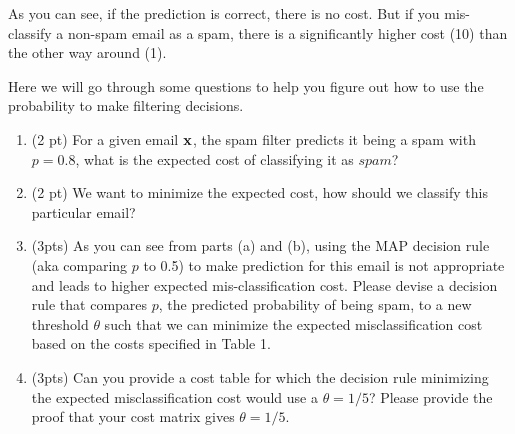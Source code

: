 \documentclass{article}
\def\x{{\bf x}}
\begin{document}
\begin{enumerate}
\begin{center}
 \end{center}
As you can see, if the prediction is correct, there is no cost. But if you mis-classify a non-spam email as a spam, there is a significantly higher cost (10) than the other way around (1). 

Here we will go through some questions to help you figure out how to use the probability to make filtering decisions.
\begin{enumerate}
    \item (2 pt) For a given email $\x$, the spam filter predicts it being a spam with $p= 0.8$, what is the expected cost of classifying it as $spam$? \\

\item (2 pt) We want to minimize the expected cost, how should we classify this particular email? \\

\item (3pts)  As you can see from parts (a) and (b), using the MAP decision rule (aka comparing $p$ to 0.5) to make prediction for this email is not appropriate and leads to higher expected mis-classification cost. Please devise a decision rule that compares $p$, the predicted probability of being spam, to a new threshold $\theta$ such that we can minimize the expected misclassification cost based on the costs specified in Table 1.\\
\item (3pts) Can you provide a cost table for which the decision rule minimizing the expected misclassification cost would use a $\theta = 1/5$? Please provide the proof that your cost matrix gives $\theta=1/5$.
\end{enumerate}


\end{enumerate}
\end{document}
